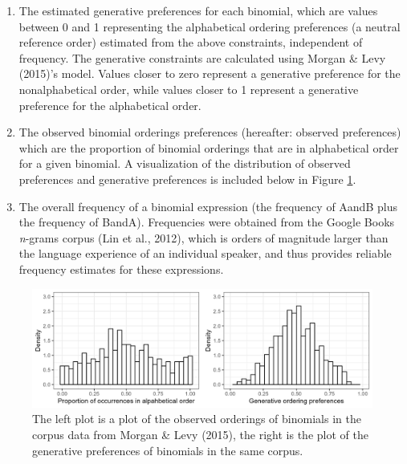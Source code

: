 \documentclass[10pt, letterpaper]{article}
\newenvironment{CodeChunk}{}{}
\begin{document}
\begin{enumerate}
\def\labelenumi{\arabic{enumi}.}
\item
  The estimated generative preferences for each binomial, which are
  values between 0 and 1 representing the alphabetical ordering
  preferences (a neutral reference order) estimated from the above
  constraints, independent of frequency. The generative constraints are
  calculated using Morgan \& Levy (2015)'s model. Values closer to zero
  represent a generative preference for the nonalphabetical order, while
  values closer to 1 represent a generative preference for the
  alphabetical order.
\item
  The observed binomial orderings preferences (hereafter: observed
  preferences) which are the proportion of binomial orderings that are
  in alphabetical order for a given binomial. A visualization of the
  distribution of observed preferences and generative preferences is
  included below in Figure \ref{fig:corpusplot1}.
\item
  The overall frequency of a binomial expression (the frequency of AandB
  plus the frequency of BandA). Frequencies were obtained from the
  Google Books \emph{n}-grams corpus (Lin et al., 2012), which is orders
  of magnitude larger than the language experience of an individual
  speaker, and thus provides reliable frequency estimates for these
  expressions.
\end{enumerate}

\begin{CodeChunk}
\begin{figure}[tb]

{\centering \includegraphics[width=1\linewidth]{Figures/corpus_plots} 

}

\caption[The left plot is a plot of the observed orderings of binomials in the corpus data from Morgan \& Levy (2015), the right is the plot of the generative preferences of binomials in the same corpus]{The left plot is a plot of the observed orderings of binomials in the corpus data from Morgan \& Levy (2015), the right is the plot of the generative preferences of binomials in the same corpus.}\label{fig:corpusplot1}
\end{figure}
\end{CodeChunk}
\end{document}
